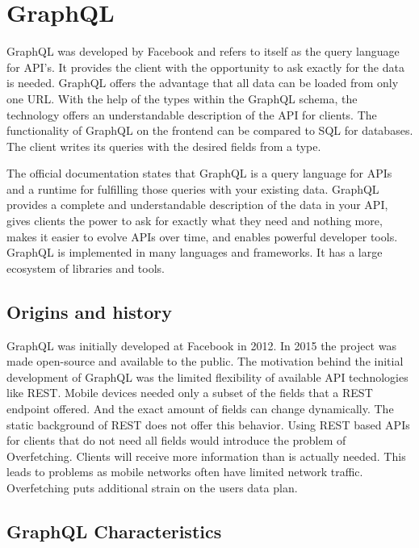 \section{GraphQL}

GraphQL was developed by Facebook and refers to itself as the query language for API's. It provides the client with the opportunity to ask exactly for the data is needed. GraphQL offers the advantage that all data can be loaded from only one URL. With the help of the types within the GraphQL schema, the technology offers an understandable description of the API for clients. \cite{misc:-:background:graphql:graphql-org} The functionality of GraphQL on the frontend can be compared to SQL for databases. The client writes its queries with the desired fields from a type.

\bigskip

\noindent The official documentation states that GraphQL is a query language for APIs and a runtime for fulfilling those queries with your existing data. GraphQL provides a complete and understandable description of the data in your API, gives clients the power to ask for exactly what they need and nothing more, makes it easier to evolve APIs over time, and enables powerful developer tools. GraphQL is implemented in many languages and frameworks. It has a large ecosystem of libraries and tools.

\subsection{Origins and history}

GraphQL was initially developed at Facebook in 2012. In 2015 the project was made open-source and available to the public. The motivation behind the initial development of GraphQL was the limited flexibility of available API technologies like REST. Mobile devices needed only a subset of the fields that a REST endpoint offered. And the exact amount of fields can change dynamically. The static background of REST does not offer this behavior. Using REST based APIs for clients that do not need all fields would introduce the problem of Overfetching. Clients will receive more information than is actually needed. This leads to problems as mobile networks often have limited network traffic. Overfetching puts additional strain on the users data plan. \cite{misc:2015:bryon:background:graphql:graphql-query-language}

\subsection{GraphQL Characteristics}

